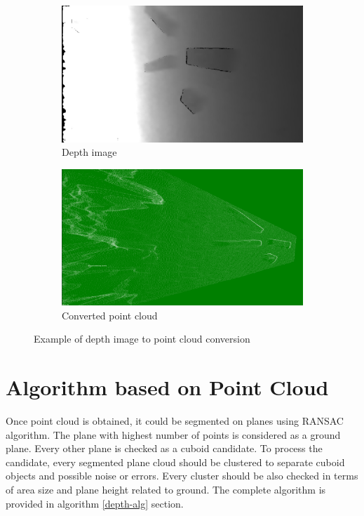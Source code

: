 \documentclass{ctuthesis}
\begin{document}
\begin{figure}[htbp]
     \centering
     \begin{subfigure}{0.475\textwidth}
         \centering
         \includegraphics[width=\textwidth]{depth_example.jpg}
         \caption{Depth image}
         \label{fig:de}
     \end{subfigure}
     \hfill
     \begin{subfigure}{0.475\textwidth}
         \centering
         \includegraphics[width=\textwidth]{point_cloud_2.png}
         \caption{Converted point cloud}
         \label{fig:pce}
     \end{subfigure}

        \caption{Example of depth image to point cloud conversion}
        \label{fig:pc-conv}
\end{figure}

\section{Algorithm based on Point Cloud} \label{pca}

Once point cloud is obtained, it could be segmented on planes using RANSAC algorithm. The plane with highest number of points is considered as a ground plane. Every other plane is checked as a cuboid candidate. To process the candidate, every segmented plane cloud should be clustered to separate cuboid objects and possible noise or errors. Every cluster should be also checked in terms of area size and plane height related to ground. The complete algorithm is provided in algorithm \ref{depth-alg} section.
\end{document}
